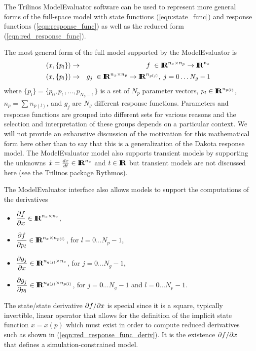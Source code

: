 \documentclass[pdf,ps2pdf,11pt]{SANDreport}
\begin{document}
The Trilinos ModelEvaluator software can be used to represent more general
forms of the full-space model with state functions (\ref{eqn:state_func}) and
response functions (\ref{eqn:response_func}) as well as the reduced form
(\ref{eqn:red_response_func}).

The most general form of the full model supported by the ModelEvaluator is
%
\begin{eqnarray}
( x, \{ p_l \} ) & \rightarrow & f \; \in\mbox{\textbf{I}}\hspace{-0.6ex}\mbox{\textbf{R}}^{n_x \times n_p} \rightarrow \mbox{\textbf{I}}\hspace{-0.6ex}\mbox{\textbf{R}}^{n_x}
\label{eqn:me:state_func} \\
( x, \{ p_l \} ) & \rightarrow & g_j \;  \in\mbox{\textbf{I}}\hspace{-0.6ex}\mbox{\textbf{R}}^{n_x \times n_p} \rightarrow \mbox{\textbf{I}}\hspace{-0.6ex}\mbox{\textbf{R}}^{n_{g(j)}},
\; j=0 \ldots N_g-1
\label{eqn:me:response_func}
\end{eqnarray}
%
where $\{ p_l \} = \{p_0,p_1,\ldots,p_{N_p-1}\}$ is a set of $N_p$ parameter
vectors, $p_l\in\mbox{\textbf{I}}\hspace{-0.6ex}\mbox{\textbf{R}}^{n_{p(l)}}$, $n_p=\sum{n_{p(l)}}$, and $g_j$ are $N_g$
different response functions.  Parameters and response functions are grouped
into different sets for various reasons and the selection and interpretation
of these groups depends on a particular context.  We will not provide an
exhaustive discussion of the motivation for this mathematical form here other
than to say that this is a generalization of the Dakota response model.  The
ModelEvaluator model also supports transient models by supporting the unknowns
$\dot{x}=\frac{dx}{dt}\in\mbox{\textbf{I}}\hspace{-0.6ex}\mbox{\textbf{R}}^{n_x}$ and $t\in\mbox{\textbf{I}}\hspace{-0.6ex}\mbox{\textbf{R}}$ but transient models are not
discussed here (see the Trilinos package Rythmos).

The ModelEvaluator interface also allows models to support the computations of
the derivatives

\begin{itemize}

{}\item $\displaystyle{\frac{\partial f}{\partial x}}\in\mbox{\textbf{I}}\hspace{-0.6ex}\mbox{\textbf{R}}^{n_x \times n_x}$,

{}\item $\displaystyle{\frac{\partial f}{\partial p_l}}\in\mbox{\textbf{I}}\hspace{-0.6ex}\mbox{\textbf{R}}^{n_x \times n_{p(l)}}$, for $l=0\ldots{}N_p-1$,

{}\item $\displaystyle{\frac{\partial g_j}{\partial x}}\in\mbox{\textbf{I}}\hspace{-0.6ex}\mbox{\textbf{R}}^{n_{g(j)} \times n_x}$, for $j=0\ldots{}N_g-1$,

{}\item $\displaystyle{\frac{\partial g_j}{\partial p_l}}\in\mbox{\textbf{I}}\hspace{-0.6ex}\mbox{\textbf{R}}^{n_{g(j)} \times n_{p(l)}}$, for
$j=0\ldots{}N_g-1$ and $l=0\ldots{}N_p-1$.

\end{itemize}

The state/state derivative $\partial f / \partial x$ is special since it is a square,
typically invertible, linear operator that allows for the definition of the
implicit state function $x=x(p)$ which must exist in order to compute reduced
derivatives such as shown in (\ref{eqn:red_response_func_deriv}).  It is the
existence $\partial f / \partial x$ that defines a simulation-constrained model.
\end{document}
